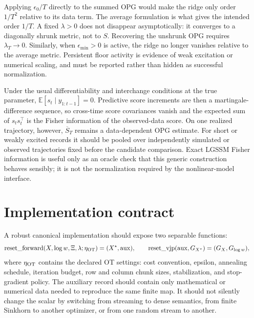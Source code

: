 Applying \(\epsilon_0/T\) directly to the summed OPG would make the ridge only
order \(1/T^2\) relative to its data term.  The average formulation is what
gives the intended order \(1/T\).  A fixed \(\lambda>0\) does not disappear
asymptotically: it converges to a diagonally shrunk metric, not to \(S\).
Recovering the unshrunk OPG requires \(\lambda_T\to0\).  Similarly, when
\(\epsilon_{\min}>0\) is active, the ridge no longer vanishes relative to the
average metric.  Persistent floor activity is evidence of weak excitation or
numerical scaling, and must be reported rather than hidden as successful
normalization.

Under the usual differentiability and interchange conditions at the true
parameter,
\(\mathbb E[s_t\mid y_{1:t-1}]=0\).  Predictive score increments are then a
martingale-difference sequence, so cross-time score covariances vanish and the
expected sum of \(s_ts_t^\top\) is the Fisher information of the observed-data
score.  On one realized trajectory, however, \(\overline S_T\) remains a
data-dependent OPG estimate.  For short or weakly excited records it should be
pooled over independently simulated or observed trajectories fixed before the
candidate comparison.  Exact LGSSM Fisher information is useful only as an
oracle check that this generic construction behaves sensibly; it is not the
normalization required by the nonlinear-model interface.

\section{Implementation contract}
\label{sec:bf-ledh-ot-implementation-contract}

A robust canonical implementation should expose two separable functions:
\[
  \operatorname{reset\_forward}(X,\log w,\Xi,\lambda;\eta_{\rm OT})
  =
  (X^\star,\mathrm{aux}),
  \qquad
  \operatorname{reset\_vjp}(\mathrm{aux},G_{X^\star})
  =
  (G_X,G_{\log w}),
\]
where \(\eta_{\rm OT}\) contains the declared OT settings: cost convention, epsilon,
annealing schedule, iteration budget, row and column chunk sizes, stabilization,
and stop-gradient policy.  The auxiliary record should contain only mathematical
or numerical data needed to reproduce the same finite map.  It should not
silently change the scalar by switching from streaming to dense semantics, from
finite Sinkhorn to another optimizer, or from one random stream to another.

